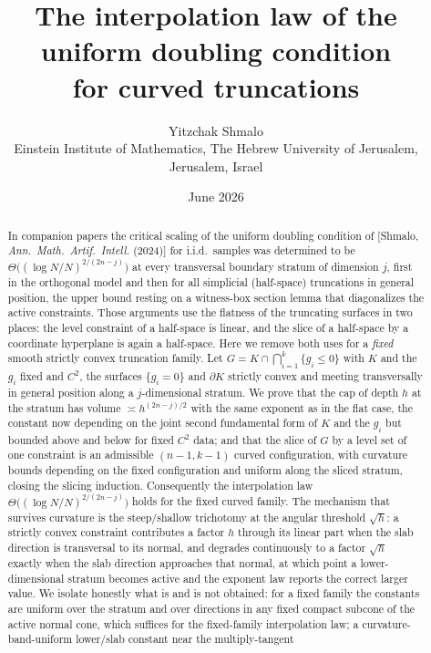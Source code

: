 \documentclass[11pt]{article}
\title{The interpolation law of the uniform doubling condition\\
for curved truncations}
\author{Yitzchak Shmalo\\
\small Einstein Institute of Mathematics, The Hebrew University of Jerusalem, Jerusalem, Israel\\
\small }
\date{June 2026}
\begin{document}
\maketitle

\begin{abstract}
In companion papers the critical scaling of the uniform doubling condition of
[Shmalo, \emph{Ann.\ Math.\ Artif.\ Intell.} (2024)] for i.i.d.\ samples was
determined to be $\Theta\bigl((\log N/N)^{2/(2n-j)}\bigr)$ at every transversal
boundary stratum of dimension $j$, first in the orthogonal model and then for
all simplicial (half-space) truncations in general position, the upper bound
resting on a witness-box section lemma that diagonalizes the active
constraints.  Those arguments use the flatness of the truncating surfaces in
two places: the level constraint of a half-space is linear, and the slice of a
half-space by a coordinate hyperplane is again a half-space.  Here we remove
both uses for a \emph{fixed} smooth strictly convex truncation family.  Let
$G=K\cap\bigcap_{i=1}^k\{g_i\le0\}$ with $K$ and the $g_i$ fixed and $C^2$, the
surfaces $\{g_i=0\}$ and $\partial K$ strictly convex and meeting transversally
in general position along a $j$-dimensional stratum.  We prove that the cap of
depth $h$ at the stratum has volume $\asymp h^{(2n-j)/2}$ with the same exponent
as in the flat case, the constant now depending on the joint second fundamental
form of $K$ and the $g_i$ but bounded above and below for fixed $C^2$ data; and
that the slice of $G$ by a level set of one constraint is an admissible
$(n-1,k-1)$ curved configuration, with curvature bounds depending on the fixed
configuration and uniform along the sliced stratum, closing the
slicing induction.  Consequently the interpolation law
$\Theta\bigl((\log N/N)^{2/(2n-j)}\bigr)$ holds for the fixed curved family.
The mechanism that survives curvature is the steep/shallow trichotomy at the
angular threshold $\sqrt h$: a strictly convex constraint contributes a factor
$h$ through its linear part when the slab direction is transversal to its
normal, and degrades continuously to a factor $\sqrt h$ exactly when the slab
direction approaches that normal, at which point a lower-dimensional stratum
becomes active and the exponent law reports the correct larger value.  We
isolate honestly what is and is not obtained: for a fixed family the constants
are uniform over the stratum and over directions in any fixed compact subcone
of the active normal cone, which suffices for the fixed-family interpolation
law; a curvature-band-uniform lower/slab constant near the multiply-tangent

\end{abstract}
\end{document}
